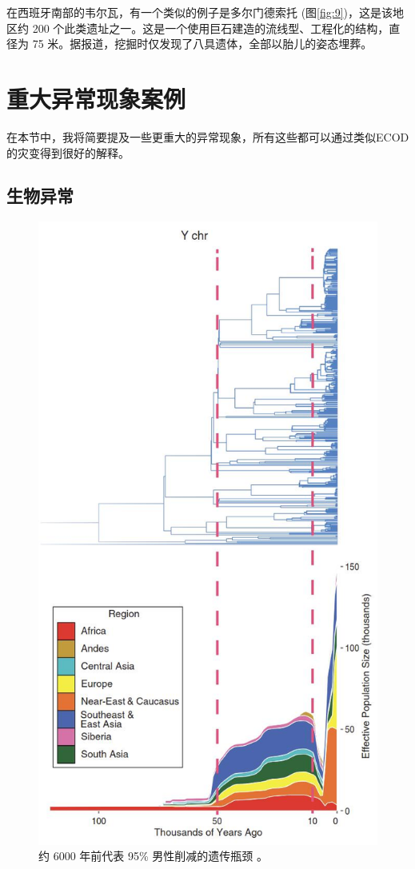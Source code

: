 \documentclass[10pt,twocolumn,letterpaper]{article}
\begin{document}
在西班牙南部的韦尔瓦，有一个类似的例子是多尔门德索托 (图\ref{fig:9})，这是该地区约 200 个此类遗址之一\cite{72,32}。这是一个使用巨石建造的流线型、工程化的结构，直径为 75 米。据报道，挖掘时仅发现了八具遗体，全部以胎儿的姿态埋葬。

\section{重大异常现象案例}

在本节中，我将简要提及一些更重大的异常现象，所有这些都可以通过类似ECOD的灾变得到很好的解释。

\subsection{生物异常}
\begin{figure}[t]
\begin{center}
   \includegraphics[width=1\linewidth]{bottleneck.jpg}
\end{center}
   \caption{约 6000 年前代表 95\% 男性削减的遗传瓶颈 \cite{62}。}
\label{fig:10}
\label{fig:onecol}
\end{figure}
\end{document}
